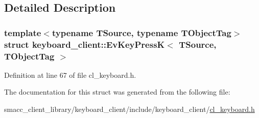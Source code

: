 \subsection{Detailed Description}
\subsubsection*{template$<$typename T\+Source, typename T\+Object\+Tag$>$\newline
struct keyboard\+\_\+client\+::\+Ev\+Key\+Press\+K$<$ T\+Source, T\+Object\+Tag $>$}



Definition at line 67 of file cl\+\_\+keyboard.\+h.



The documentation for this struct was generated from the following file\+:\begin{DoxyCompactItemize}
\item 
smacc\+\_\+client\+\_\+library/keyboard\+\_\+client/include/keyboard\+\_\+client/\hyperlink{cl__keyboard_8h}{cl\+\_\+keyboard.\+h}\end{DoxyCompactItemize}
